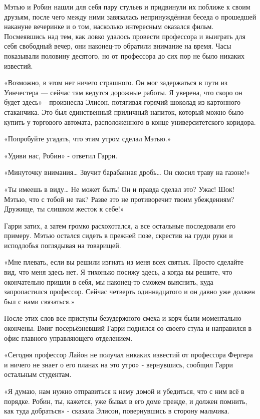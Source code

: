 \documentclass[a4paper,12pt]{book}
\begin{document}
\par
Мэтью и Робин нашли для себя пару стульев и придвинули их поближе к своим друзьям, после чего между ними завязалась непринуждённая беседа о прошедшей накануне вечеринке и о том, насколько интересным оказался фильм. Посмеявшись над тем, как ловко удалось провести профессора и выиграть для себя свободный вечер, они наконец-то обратили внимание на время. Часы показывали половину десятого, но от профессора до сих пор не было никаких известий.
\par
«Возможно, в этом нет ничего страшного. Он мог задержаться в пути из Уинчестера — сейчас там ведутся дорожные работы. Я уверена, что скоро он будет здесь» - произнесла Элисон, потягивая горячий шоколад из картонного стаканчика. Это был единственный приличный напиток, который можно было купить у торгового автомата, расположенного в конце университетского коридора.
\par
«Попробуйте угадать, что этим утром сделал Мэтью.»
\par
«Удиви нас, Робин» - ответил Гарри.
\par
«Минуточку внимания…  Звучит барабанная дробь… Он скосил траву на газоне!»
\par
«Ты имеешь в виду… Не может быть! Он и правда сделал это? Ужас! Шок! Мэтью, что с тобой не так? Разве это не противоречит твоим убеждениям? Дружище, ты слишком жесток к себе!»
\par
Гарри затих, а затем громко расхохотался, а все остальные последовали его примеру. Мэтью остался сидеть в прежней позе, скрестив на груди руки и исподлобья поглядывая на товарищей.
\par
«Мне плевать, если вы решили изгнать из меня всех святых. Просто сделайте вид, что меня здесь нет. Я тихонько посижу здесь, а когда вы решите, что окончательно пришли в себя, мы наконец-то сможем выяснить, куда запропастился профессор. Сейчас четверть одиннадцатого и он давно уже должен был с нами связаться.»
\par
После этих слов все приступы безудержного смеха и корч были моментально окончены. Вмиг посерьёзневший Гарри поднялся со своего стула и направился в офис главного управляющего отделением.\\
\par
«Сегодня профессор Лайон не получал никаких известий от профессора Фергера и ничего не знает о его планах на это утро» - вернувшись, сообщил Гарри остальным студентам.
\par
«Я думаю, нам нужно отправиться к нему домой и убедиться, что с ним всё в порядке. Робин, ты, кажется, уже бывал в его доме прежде, и должен помнить, как туда добраться» - сказала Элисон, повернувшись в сторону мальчика.
\end{document}
